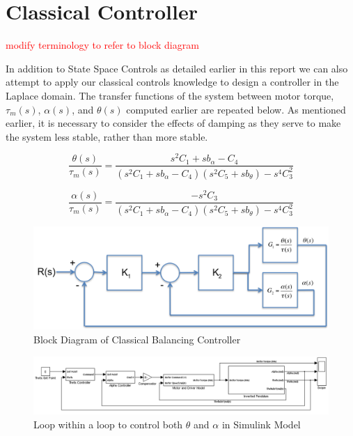 \documentclass{article}
\newcommand{\xxx}[1]{\textcolor{red}{#1}}
\theoremstyle{plain}
\theoremstyle{definition}
\theoremstyle{remark}
\begin{document}
\clearpage
\section{Classical Controller}

\xxx{modify terminology to refer to block diagram}

In addition to State Space Controls as detailed earlier in this report we can also attempt to apply our classical controls knowledge to design a controller in the Laplace domain.  The transfer functions of the system between motor torque, $\tau_m(s)$, $\alpha(s)$, and $\theta(s)$ computed earlier are repeated below.  As mentioned earlier, it is necessary to consider the effects of damping as they serve to make the system less stable, rather than more stable.  

\begin{equation}
 \frac{\theta(s)}{\tau_{m}(s)} = \frac{s^2 C_1 + s b_{\alpha} - C_4}{\left(s^2C_1 + s b_{\alpha} - C_4 \right) \left(s^2 C_5  + s b_{\theta} \right) - s^4 C_3^2}
\label{thetaTF1}
\end{equation}

\begin{equation}
\frac{\alpha(s)}{\tau_{m}(s)} = \frac{-s^2 C_3}{\left(s^2C_1 + s b_{\alpha} - C_4 \right) \left(s^2 C_5  + s b_{\theta} \right) - s^4 C_3^2}
\label{alphaTF2}
\end{equation}

\begin{figure}[hbt]
\begin{center}
\includegraphics[width = 15cm]{classicalBlockDesign.png}
\end{center}
\caption{Block Diagram of Classical Balancing Controller}
\label{classicalControllerBlock}
\end{figure}

\begin{figure}[hbt]
\begin{center}
\includegraphics[width = 17cm]{ClassicalControllerBlock.png}
\end{center}
\caption{Loop within a loop to control both $\theta$ and $\alpha$ in Simulink Model}
\label{classicalSimulink}
\end{figure}
\end{document}
